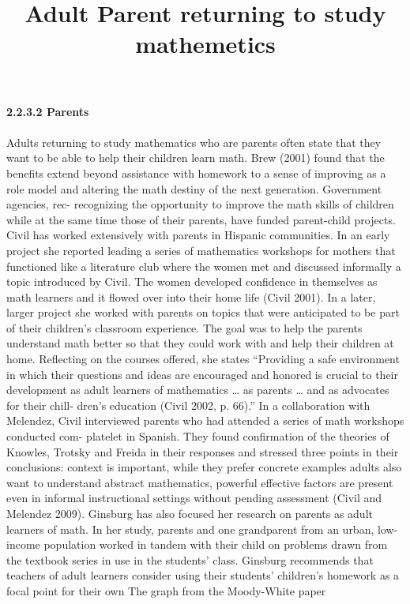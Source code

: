 \documentclass{article}
\title{Adult Parent returning to study mathemetics}
\begin{document}


\textbf{ 2.2.3.2 Parents }
\textit{\\\\} 
 Adults returning to study mathematics who are parents often state that they want
 to be able to help their children learn math. Brew (2001) found that the benefits
 extend beyond assistance with homework to a sense of improving as a role model
 and altering the math destiny of the next generation. Government agencies, rec-
   recognizing the opportunity to improve the math skills of children while at 
 the same time those of their parents, have funded parent-child projects.
 Civil has worked extensively with parents in Hispanic communities. In an early
 project she reported leading a series of mathematics workshops for mothers that
 functioned like a literature club where the women met and discussed informally
 a topic introduced by Civil. The women developed confidence in themselves as
 math learners and it flowed over into their home life (Civil 2001). In a later, larger
 project she worked with parents on topics that were anticipated to be part of their
 children’s classroom experience. The goal was to help the parents understand math
 better so that they could work with and help their children at home. Reflecting
 on the courses offered, she states “Providing a safe environment in which their
 questions and ideas are encouraged and honored is crucial to their development
 as adult learners of mathematics … as parents … and as advocates for their chill-
   dren’s education (Civil 2002, p. 66).” In a collaboration with Melendez, Civil
 interviewed parents who had attended a series of math workshops conducted com-
   platelet in Spanish. They found confirmation of the theories of Knowles, Trotsky
 and Freida in their responses and stressed three points in their conclusions: context
 is important, while they prefer concrete examples adults also want to understand
 abstract mathematics, powerful effective factors are present even in informal
 instructional settings without pending assessment (Civil and Melendez 2009).
 Ginsburg has also focused her research on parents as adult learners of math.
 In her study, parents and one grandparent from an urban, low-income population
 worked in tandem with their child on problems drawn from the textbook series
 in use in the students’ class. Ginsburg recommends that teachers of adult learners
 consider using their students’ children’s homework as a focal point for their own
 The graph from the Moody-White paper
\textit{\\\\}
\end{document}
